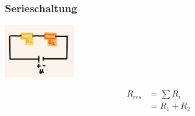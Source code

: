     \subsubsection*{Serieschaltung}
    \vspace{-1mm}
    \begin{minipage}{0.49\linewidth}
        \begin{footnotesize}
            \begin{center}
                \vspace{2mm}
                \includegraphics[width = 30mm]{src/images/serieschaltung.png}
            \end{center}
        \end{footnotesize}
    \end{minipage}
    \begin{minipage}{0.5\linewidth}
        \begin{scriptsize}
            \begin{center}
                \begin{align*}
                    R_{res} &= \sum R_i
                    \\ &= R_1 + R_2 
                \end{align*}
            \end{center}
        \end{scriptsize}
    \end{minipage}
    \vspace{1mm}

